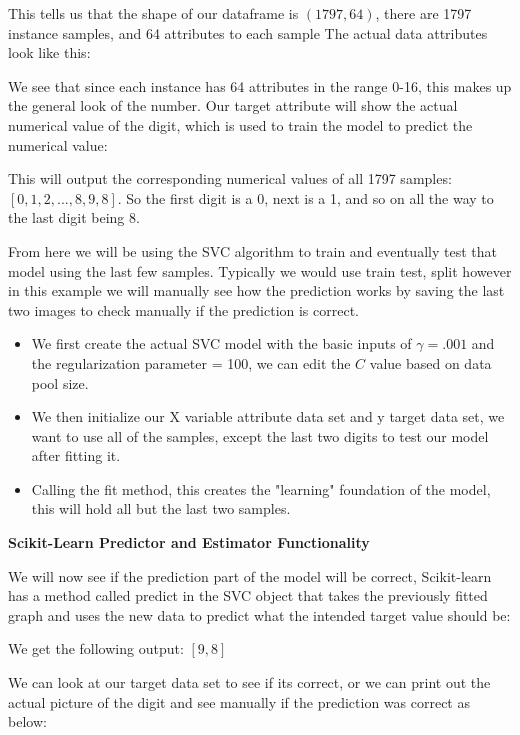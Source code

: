 \documentclass[a4paper,12pt]{report}
\newcommand{\msection}[1]{\noindent\textbf{#1}}
\begin{document}
This tells us that the shape of our dataframe is $(1797, 64)$, there are 1797 instance samples, and 64 attributes to each sample
The actual data attributes look like this:


We see that since each instance has 64 attributes in the range 0-16, this makes up the general look of the number. Our target attribute will show the actual numerical value of the digit, which is used to train the model to predict the numerical value:


This will output the corresponding numerical values of all 1797 samples: $[0, 1, 2, ..., 8, 9, 8]$. So the first digit is a 0, next is a 1, and so on all the way to the last digit being 8.

From here we will be using the SVC algorithm to train and eventually test that model using the last few samples. Typically we would use train test, split however in this example we will manually see how the prediction works by saving the last two images to check manually if the prediction is correct.

\begin{itemize}[,]
    \setlength\itemsep{-.1cm}
    \item We first create the actual SVC model with the basic inputs of $\gamma = .001$ and the regularization parameter = 100, we can edit the $C$ value based on data pool size.
    \item We then initialize our X variable attribute data set and y target data set, we want to use all of the samples, except the last two digits to test our model after fitting it.
    \item Calling the fit method, this creates the "learning" foundation of the model, this will hold all but the last two samples.
\end{itemize}

\msection{Scikit-Learn Predictor and Estimator Functionality}

We will now see if the prediction part of the model will be correct, Scikit-learn has a method called predict in the SVC object that takes the previously fitted graph and uses the new data to predict what the intended target value should be:


We get the following output: $[9, 8]$

We can look at our target data set to see if its correct, or we can print out the actual picture of the digit and see manually if the prediction was correct as below:
\end{document}
